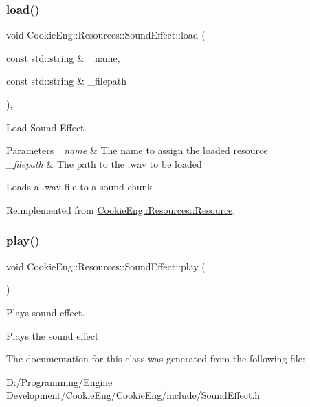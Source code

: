 \subsubsection{\texorpdfstring{load()}{load()}}
{\footnotesize\ttfamily void Cookie\+Eng\+::\+Resources\+::\+Sound\+Effect\+::load (\begin{DoxyParamCaption}\item[{const std\+::string \&}]{\+\_\+name,  }\item[{const std\+::string \&}]{\+\_\+filepath }\end{DoxyParamCaption})\hspace{0.3cm}{\ttfamily [override]}, {\ttfamily [virtual]}}



Load Sound Effect. 


\begin{DoxyParams}{Parameters}
{\em \+\_\+name} & The name to assign the loaded resource \\
\hline
{\em \+\_\+filepath} & The path to the .wav to be loaded\\
\hline
\end{DoxyParams}
Loads a .wav file to a sound chunk 

Reimplemented from \hyperlink{class_cookie_eng_1_1_resources_1_1_resource_a75648b8f2e442bebc90d6eb4ea3a2f6e}{Cookie\+Eng\+::\+Resources\+::\+Resource}.

\mbox{\label{class_cookie_eng_1_1_resources_1_1_sound_effect_a9f4e738f2cbc849e7fab8549bf09fb02}} 
\subsubsection{\texorpdfstring{play()}{play()}}
{\footnotesize\ttfamily void Cookie\+Eng\+::\+Resources\+::\+Sound\+Effect\+::play (\begin{DoxyParamCaption}{ }\end{DoxyParamCaption})}



Plays sound effect. 

Plays the sound effect 

The documentation for this class was generated from the following file\+:\begin{DoxyCompactItemize}
\item 
D\+:/\+Programming/\+Engine Development/\+Cookie\+Eng/\+Cookie\+Eng/include/Sound\+Effect.\+h\end{DoxyCompactItemize}
